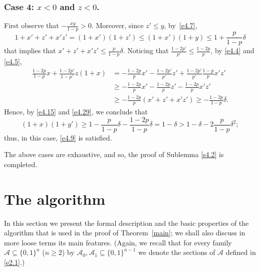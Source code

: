 \documentclass[10pt]{amsart}
\theoremstyle{remark}
\newcommand{\meg}{\geqslant}
\newcommand{\mik}{\leqslant}
\newcommand{\Acal}{\mathcal{A}}
\begin{document}
\subsubsection*{Case 4: $x<0$ and $z<0$.} First observe that $-\frac{xy}{1-p}>0$.
Moreover, since $z'\mik y$, by~\eqref{e4.7},
\begin{equation} \label{e4.28}
1+x'+z'+x'z'=(1+x')(1+z') \mik (1+x')(1+y) \mik 1+\frac{p}{1-p}\delta
\end{equation}
that implies that $x'+z'+x'z'\mik \frac{p}{1-p}\delta$. Noticing that $\frac{1-2p'}{p'}\mik \frac{1-2p}{p}$,
by \eqref{e4.4} and \eqref{e4.5},
\begin{align}
\label{e4.29} \frac{1-2p}{1-p}x+\frac{1-2p'}{1-p'}z(1+x) & =
-\frac{1-2p}{p}x'-\frac{1-2p'}{p'}z'+\frac{1-2p'}{p'}\frac{1-p}{p}x'z' \\
& \meg -\frac{1-2p}{p}x'-\frac{1-2p}{p}z'-\frac{1-2p}{p}x'z' \nonumber \\
& \meg -\frac{1-2p}{p}(x'+z'+x'z')\meg  -\frac{1-2p}{1-p}\delta. \nonumber
\end{align}
Hence, by \eqref{e4.15} and \eqref{e4.29}, we conclude that
\begin{equation} \label{e4.30}
(1+x)(1+y')\meg 1-\frac{p}{1-p}\delta-\frac{1-2p}{1-p}\delta=
1-\delta>1-\delta-2\frac{p}{1-p}\delta^2;
\end{equation}
thus, in this case, \eqref{e4.9} is satisfied.
\medskip

The above cases are exhaustive, and so, the proof of Sublemma \ref{s4.2} is completed.


\section{The algorithm} \label{sec5}


In this section we present the formal description and the basic properties of
the algorithm that is used in the proof of Theorem~\ref{main}; we shall also discuss in more
loose terms its main features. (Again, we recall that for every family
$\mathcal{A}\subseteq \{0,1\}^n$ ($n\meg 2$) by $\mathcal{A}_0,\mathcal{A}_1\subseteq \{0,1\}^{n-1}$
we denote the sections of $\Acal$ defined in \eqref{e2.1}.)
\end{document}
